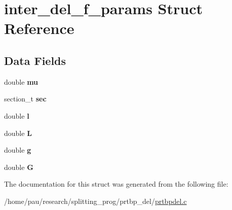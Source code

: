 \hypertarget{structinter__del__f__params}{
\section{inter\_\-del\_\-f\_\-params Struct Reference}
\label{structinter__del__f__params}
}
\subsection*{Data Fields}
\begin{DoxyCompactItemize}
\item 
\hypertarget{structinter__del__f__params_a74577585cf12d1712ab9c57616d49205}{
double {\bfseries mu}}
\label{structinter__del__f__params_a74577585cf12d1712ab9c57616d49205}

\item 
\hypertarget{structinter__del__f__params_a8e9048bbbc09d262d70946d4658836b4}{
section\_\-t {\bfseries sec}}
\label{structinter__del__f__params_a8e9048bbbc09d262d70946d4658836b4}

\item 
\hypertarget{structinter__del__f__params_a59e80b8ba32c12c6d0a868f17a19ae48}{
double {\bfseries l}}
\label{structinter__del__f__params_a59e80b8ba32c12c6d0a868f17a19ae48}

\item 
\hypertarget{structinter__del__f__params_a2442c8274ae11905a74c1bf95501af09}{
double {\bfseries L}}
\label{structinter__del__f__params_a2442c8274ae11905a74c1bf95501af09}

\item 
\hypertarget{structinter__del__f__params_ab30c765b9be1b7776c97c899a12a66bb}{
double {\bfseries g}}
\label{structinter__del__f__params_ab30c765b9be1b7776c97c899a12a66bb}

\item 
\hypertarget{structinter__del__f__params_a67783a2c4f670ee5a9dadcf428324d32}{
double {\bfseries G}}
\label{structinter__del__f__params_a67783a2c4f670ee5a9dadcf428324d32}

\end{DoxyCompactItemize}


The documentation for this struct was generated from the following file:\begin{DoxyCompactItemize}
\item 
/home/pau/research/splitting\_\-prog/prtbp\_\-del/\hyperlink{prtbpdel_8c}{prtbpdel.c}\end{DoxyCompactItemize}
